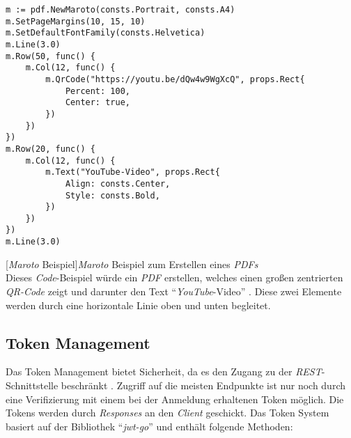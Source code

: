 \begin{verbatim}
m := pdf.NewMaroto(consts.Portrait, consts.A4)
m.SetPageMargins(10, 15, 10)
m.SetDefaultFontFamily(consts.Helvetica)
m.Line(3.0)
m.Row(50, func() {
	m.Col(12, func() {
		m.QrCode("https://youtu.be/dQw4w9WgXcQ", props.Rect{
			Percent: 100,
			Center: true,
		})
	})
})
m.Row(20, func() {
	m.Col(12, func() {
		m.Text("YouTube-Video", props.Rect{
			Align: consts.Center,
			Style: consts.Bold,
		})
	})
})
m.Line(3.0)
\end{verbatim}
[\textit{Maroto} Beispiel]{\textit{Maroto} Beispiel zum Erstellen eines \textit{PDFs} \cite{marotoart}}
~\\
Dieses \textit{Code}-Beispiel würde ein \textit{PDF} erstellen, welches einen großen zentrierten \textit{QR-Code} zeigt und darunter den Text \enquote{\textit{YouTube}-Video} \cite{maroto}. Diese zwei Elemente werden durch eine horizontale Linie oben und unten begleitet.

\newpage
\subsection{Token Management}

Das Token Management bietet Sicherheit, da es den Zugang zu der \textit{REST}-Schnittstelle beschränkt \cite{jwt-go} \cite{tokenmanager}. Zugriff auf die meisten Endpunkte ist nur noch durch eine Verifizierung mit einem bei der Anmeldung erhaltenen Token möglich. Die Tokens werden durch \textit{Responses} an den \textit{Client} geschickt. Das Token System basiert auf der Bibliothek \enquote{\textit{jwt-go}} und enthält folgende Methoden:

